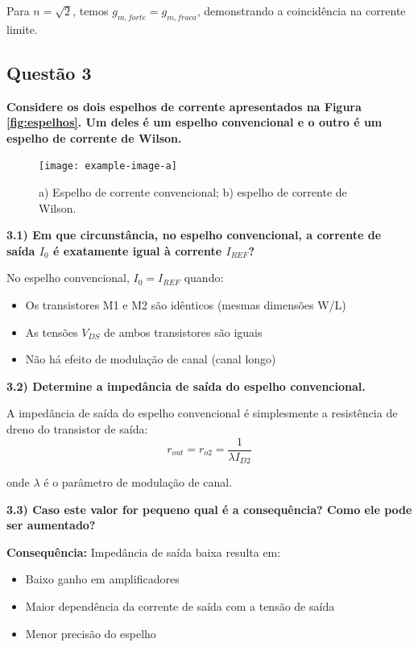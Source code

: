 ﻿\documentclass[12pt,a4paper]{article}
\begin{document}
Para $n = \sqrt{2}$, temos $g_{m,forte} = g_{m,fraca}$, demonstrando a coincidência na corrente limite.

\subsection*{Questão 3}
\textbf{Considere os dois espelhos de corrente apresentados na Figura \ref{fig:espelhos}. Um deles é um espelho convencional e o outro é um espelho de corrente de Wilson.}

\begin{figure}[H]
    \centering
    \texttt{[image: example-image-a]}
    \caption{a) Espelho de corrente convencional; b) espelho de corrente de Wilson.}
    \label{fig:espelhos_corrente}
\end{figure}

\textbf{3.1) Em que circunstância, no espelho convencional, a corrente de saída $I_0$ é exatamente igual à corrente $I_{REF}$?}

No espelho convencional, $I_0 = I_{REF}$ quando:
\begin{itemize}
    \item Os transistores M1 e M2 são idênticos (mesmas dimensões W/L)
    \item As tensões $V_{DS}$ de ambos transistores são iguais
    \item Não há efeito de modulação de canal (canal longo)
\end{itemize}

\textbf{3.2) Determine a impedância de saída do espelho convencional.}

A impedância de saída do espelho convencional é simplesmente a resistência de dreno do transistor de saída:
$$r_{out} = r_{o2} = \frac{1}{\lambda I_{D2}}$$

onde $\lambda$ é o parâmetro de modulação de canal.

\textbf{3.3) Caso este valor for pequeno qual é a consequência? Como ele pode ser aumentado?}

\textbf{Consequência:} Impedância de saída baixa resulta em:
\begin{itemize}
    \item Baixo ganho em amplificadores
    \item Maior dependência da corrente de saída com a tensão de saída
    \item Menor precisão do espelho
\end{itemize}
\end{document}
